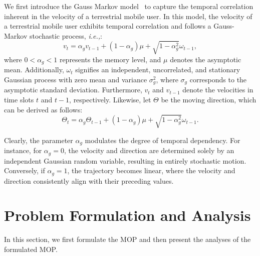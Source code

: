 \documentclass[10pt,journal,compsoc]{IEEEtran}
\begin{document}
\par We first introduce the Gauss Markov model~\cite{tabassum2019fundamentals} to capture the temporal correlation inherent in the velocity of a terrestrial mobile user. In this model, the velocity of a terrestrial mobile user exhibits temporal correlation and follows a Gauss-Markov stochastic process, \textit{i.e.,}:
\begin{equation}
    v_t = \alpha_g v_{t-1} + ( 1 - \alpha_g ) \mu + \sqrt{1 - \alpha_g^2} \omega_{t-1},
\end{equation}
\noindent where $0 < \alpha_g < 1$ represents the memory level, and $\mu$ denotes the asymptotic mean. Additionally, $\omega_{t}$ signifies an independent, uncorrelated, and stationary Gaussian process with zero mean and variance $\sigma_g^2$, where $\sigma_g$ corresponds to the asymptotic standard deviation. Furthermore, $v_t$ and $v_{t-1}$ denote the velocities in time slots $t$ and $t-1$, respectively. Likewise, let $\Theta$ be the moving direction, which can be derived as follows:
\begin{equation}
    \Theta_t = \alpha_g \Theta_{t-1} + ( 1 - \alpha_g ) \mu + \sqrt{1 - \alpha_g^2} \omega_{t-1}.
\end{equation}

\par Clearly, the parameter $\alpha_g$ modulates the degree of temporal dependency. For instance, for $\alpha_g = 0$, the velocity and direction are determined solely by an independent Gaussian random variable, resulting in entirely stochastic motion. Conversely, if $\alpha_g = 1$, the trajectory becomes linear, where the velocity and direction consistently align with their preceding values. 


%
%
%
\section{Problem Formulation and Analysis}
\label{sec: problem formulation and analysis}

\par In this section, we first formulate the MOP and then present the analyses of the formulated MOP.
\end{document}
